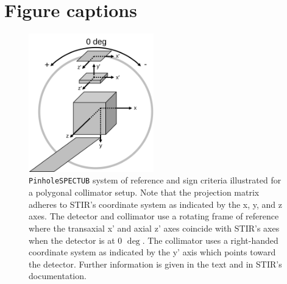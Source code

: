 \documentclass[utf8]{FrontiersinHarvard} %
\begin{document}
\section*{Figure captions}


\begin{figure}[h!]
\begin{center}
\includegraphics[height=6cm]{Figures/STIR-UsersGuide_PinholeSPECTUB}
\end{center}
\caption{\texttt{PinholeSPECTUB} system of reference and sign criteria illustrated for a polygonal collimator setup. Note that the projection matrix adheres to STIR's coordinate system as indicated by the x, y, and z axes. The detector and collimator use a rotating frame of reference where the transaxial x' and axial z' axes coincide with STIR's axes when the detector is at 0 $\mathrm{\deg}$. The collimator uses a right-handed coordinate system as indicated by the y' axis which points toward the detector. Further information is given in the text and in STIR's documentation.}
\label{fig:PinholeSPECTUB_coords}
\end{figure}
\end{document}
